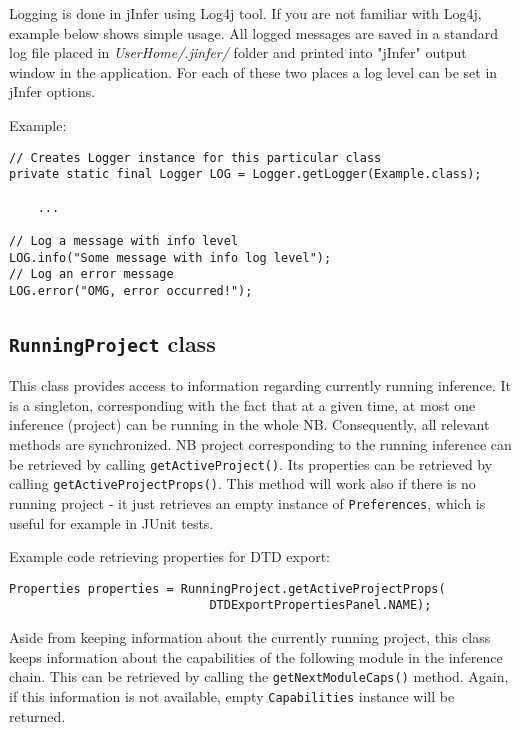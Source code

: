 \documentclass[a4paper,10pt,oneside]{article}
\begin{document}
\par 
  Logging is done in jInfer using
  Log4j tool.
  If you are not familiar with Log4j, example below shows simple usage. All
  logged messages are saved in a standard log file placed in \textit{UserHome/.jinfer/}
  folder and printed into "jInfer" output window in the application. For each
  of these two places a log level can be set in jInfer options.


Example:
\begin{verbatim}
// Creates Logger instance for this particular class
private static final Logger LOG = Logger.getLogger(Example.class);

    ...

// Log a message with info level
LOG.info("Some message with info log level");
// Log an error message
LOG.error("OMG, error occurred!");
\end{verbatim}

\subsection*{\texttt{RunningProject} class}

\par 
  This class provides access to information regarding currently running inference.
  It is a singleton, corresponding with the fact that at a given time, at most
  one inference (project) can be running in the whole NB. Consequently, all relevant methods
  are synchronized.
  NB project corresponding to the running inference can be retrieved by
  calling \texttt{getActiveProject()}. Its properties can be retrieved by
  calling \texttt{getActiveProjectProps()}. This
  method will work also if there is no running project - it just retrieves an
  empty instance of \texttt{Preferences}, which is useful for example in JUnit
  tests.

Example code retrieving properties for DTD export:
\begin{verbatim}
Properties properties = RunningProject.getActiveProjectProps(
                            DTDExportPropertiesPanel.NAME);
\end{verbatim}

\par 
  Aside from keeping information about the currently running project, this class
  keeps information about the capabilities of the following module in the inference
  chain. This can be retrieved by calling the \texttt{getNextModuleCaps()} method.
  Again, if this information is not available, empty \texttt{Capabilities}
  instance will be returned.
\end{document}
